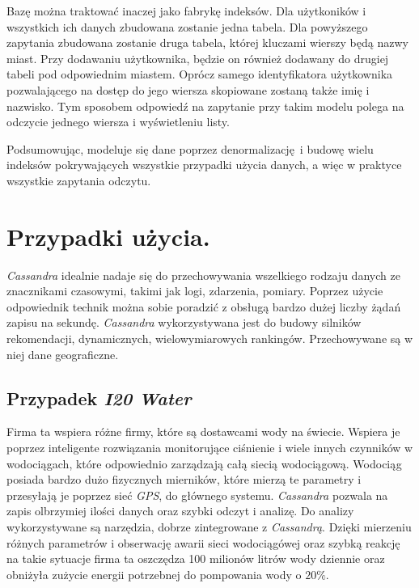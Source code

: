 \documentclass[oneside, 11pt, a4paper]{article}
\begin{document}
\begin{multicols}{2}
Bazę można traktować inaczej jako fabrykę indeksów. Dla użytkoników i wszystkich ich danych zbudowana zostanie jedna tabela. Dla powyższego zapytania zbudowana zostanie druga tabela, której kluczami wierszy będą nazwy miast. Przy dodawaniu użytkownika, będzie on również dodawany do drugiej tabeli pod odpowiednim miastem. Oprócz samego identyfikatora użytkownika pozwalającego na dostęp do jego wiersza skopiowane zostaną także imię i nazwisko. Tym sposobem odpowiedź na zapytanie przy takim modelu polega na odczycie jednego wiersza i wyświetleniu listy.

Podsumowując, modeluje się dane poprzez denormalizację i budowę wielu indeksów pokrywających wszystkie przypadki użycia danych, a więc w praktyce wszystkie zapytania odczytu.

\section{Przypadki użycia.}
\emph{Cassandra} idealnie nadaje się do przechowywania wszelkiego rodzaju danych ze znacznikami czasowymi, takimi jak logi, zdarzenia, pomiary. Poprzez użycie odpowiednik technik można sobie poradzić z obsługą bardzo dużej liczby żądań zapisu na sekundę. \emph{Cassandra} wykorzystywana jest do budowy silników rekomendacji, dynamicznych, wielowymiarowych rankingów. Przechowywane są w niej dane geograficzne.

\subsection{Przypadek \emph{I20 Water}} 
Firma ta wspiera różne firmy, które są dostawcami wody na świecie. Wspiera je poprzez inteligente rozwiązania monitorujące ciśnienie i wiele innych czynników w wodociągach, które odpowiednio zarządzają całą siecią wodociągową. Wodociąg posiada bardzo dużo fizycznych mierników, które mierzą te parametry i przesyłają je poprzez sieć \emph{GPS}, do głównego systemu. \emph{Cassandra} pozwala na zapis olbrzymiej ilości danych oraz szybki odczyt i analizę. Do analizy wykorzystywane są narzędzia, dobrze zintegrowane z \emph{Cassandrą}. Dzięki mierzeniu różnych parametrów i obserwację awarii sieci wodociągówej oraz szybką reakcję na takie sytuacje firma ta oszczędza 100 milionów litrów wody dziennie oraz obniżyła zużycie energii potrzebnej do pompowania wody o $20\%$.




\end{multicols}
\end{document}
